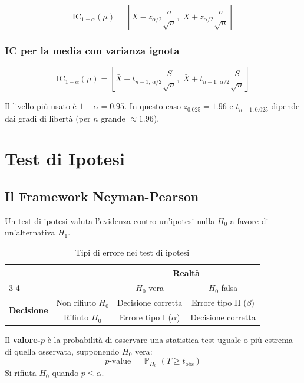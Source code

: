 \documentclass[12pt, a4paper]{article}
\DeclareMathOperator{\Prob}{\mathbb{P}}
\begin{document}
\[
  \text{IC}_{1-\alpha}(\mu) =
  \left[\bar{X} - z_{\alpha/2}\frac{\sigma}{\sqrt{n}},\;
        \bar{X} + z_{\alpha/2}\frac{\sigma}{\sqrt{n}}\right]
\]

\subsubsection{IC per la media con varianza ignota}

\[
  \text{IC}_{1-\alpha}(\mu) =
  \left[\bar{X} - t_{n-1,\,\alpha/2}\frac{S}{\sqrt{n}},\;
        \bar{X} + t_{n-1,\,\alpha/2}\frac{S}{\sqrt{n}}\right]
\]

\begin{nota}
  Il livello più usato è $1-\alpha = 0.95$. In questo caso $z_{0.025} = 1.96$
  e $t_{n-1, 0.025}$ dipende dai gradi di libertà (per $n$ grande $\approx 1.96$).
\end{nota}

\section{Test di Ipotesi}

\subsection{Il Framework Neyman-Pearson}

Un test di ipotesi valuta l'evidenza contro un'ipotesi nulla $H_0$
a favore di un'alternativa $H_1$.

\begin{table}[h!]
  \centering
  \caption{Tipi di errore nei test di ipotesi}
  \begin{tabular}{lccc}
    \toprule
    & & \multicolumn{2}{c}{\textbf{Realtà}} \\
    \cmidrule(lr){3-4}
    & & $H_0$ vera & $H_0$ falsa \\
    \midrule
    \multirow{2}{*}{\textbf{Decisione}} &
      Non rifiuto $H_0$ & Decisione corretta & Errore tipo II ($\beta$) \\
    & Rifiuto $H_0$    & Errore tipo I ($\alpha$) & Decisione corretta \\
    \bottomrule
  \end{tabular}
\end{table}

\begin{definizione}[Valore-$p$]
  Il \textbf{valore-$p$} è la probabilità di osservare una statistica test
  uguale o più estrema di quella osservata, supponendo $H_0$ vera:
  \[
    p\text{-value} = \Prob_{H_0}(T \ge t_{\text{obs}})
  \]
  Si rifiuta $H_0$ quando $p \le \alpha$.
\end{definizione}
\end{document}
